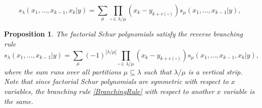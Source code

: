 \documentclass[10pt,a4paper]{amsart}
\newtheorem{prop}{Proposition}
\begin{document}
\begin{equation}\label{BranchingRule}
    s_{\lambda}(x_1, \ldots, x_{k-1},x_k|y) = \sum\limits_{\mu} \prod\limits_{\square \in \lambda / \mu}(x_k - y_{k + c(\square)}) s_{\mu}(x_1, \ldots, x_{k-1}|y),
\end{equation}

\begin{prop}
The factorial Schur polynomials satisfy the reverse branching rule
\begin{equation}\label{ReverseBranching}
    s_{\lambda}(x_1, \ldots, x_{k - 1}|y) = \sum\limits_{\mu}(-1)^{|\lambda/\mu|}\prod\limits_{\square \in \lambda / \mu}(x_k - y_{k + c(\square)}) s_{\mu}(x_1, \ldots, x_{k - 1}, x_k|y),
\end{equation}
where the sum runs over all partitions $\mu \subseteq \lambda$ such that $\lambda / \mu$ is a vertical strip. Note that since factorial Schur polynomials are symmetric with respect to $x$ variables, the branching rule \eqref{BranchingRule} with respect to another $x$ variable is the same.
\end{prop}
\end{document}
